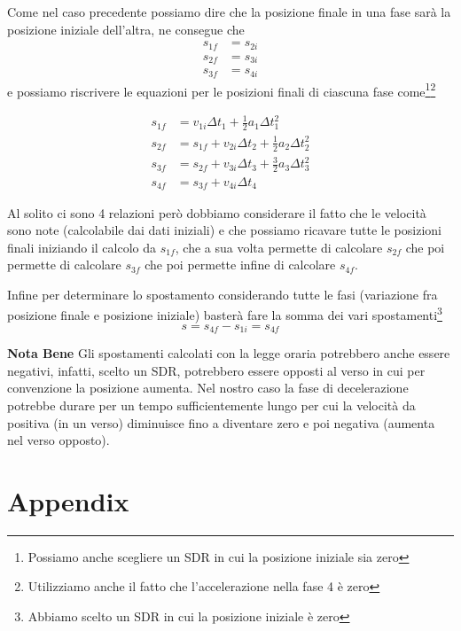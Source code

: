 \documentclass{article}
\begin{document}
Come nel caso precedente possiamo dire che la posizione finale in una fase sarà la posizione iniziale dell'altra, ne consegue che
\begin{align}
  s_{1f} &= s_{2i} \\
  s_{2f} &= s_{3i} \\
  s_{3f} &= s_{4i}
\end{align}
e possiamo riscrivere le equazioni per le posizioni finali di ciascuna fase come\footnote{Possiamo anche scegliere un SDR in cui la posizione iniziale sia zero}\footnote{Utilizziamo anche il fatto che l'accelerazione nella fase 4 è zero}

\begin{align}
  s_{1f} &= v_{1i} \Delta t_1 + \frac{1}{2} a_1 \Delta t_1^2\\
  s_{2f} &= s_{1f} + v_{2i} \Delta t_2 + \frac{1}{2} a_2 \Delta t_2^2\\
  s_{3f} &= s_{2f} + v_{3i} \Delta t_3 + \frac{3}{2} a_3 \Delta t_3^2\\
  s_{4f} &= s_{3f} + v_{4i} \Delta t_4
\end{align}

Al solito ci sono 4 relazioni però dobbiamo considerare il fatto che le velocità sono note (calcolabile dai dati iniziali) e che possiamo ricavare tutte le posizioni finali iniziando il calcolo da $s_{1f}$, che a sua volta permette di calcolare $s_{2f}$ che poi permette di calcolare $s_{3f}$ che poi permette infine di calcolare $s_{4f}$.

Infine per determinare lo spostamento considerando tutte le fasi (variazione fra posizione finale e posizione iniziale) basterà fare la somma dei vari spostamenti\footnote{Abbiamo scelto un SDR in cui la posizione iniziale è zero}
\begin{equation}
  s = s_{4f} - s_{1i} = s_{4f}
\end{equation}

\textbf{Nota Bene} Gli spostamenti calcolati con la legge oraria potrebbero anche essere negativi, infatti, scelto un SDR, potrebbero essere opposti al verso in cui per convenzione la posizione aumenta. Nel nostro caso la fase di decelerazione potrebbe durare per un tempo sufficientemente lungo per cui la velocità da positiva (in un verso) diminuisce fino a diventare zero e poi negativa (aumenta nel verso opposto).


\newpage
\section*{Appendix}
\end{document}
